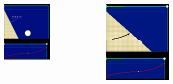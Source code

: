 \documentclass{beamer}
\begin{document}
\begin{frame}
\begin{figure}
	\begin{columns}
		\begin{column}{0.5\textwidth}
			\begin{figure}
				\centering
			\includegraphics[width=0.9\textwidth]{images/arc1.png}	
			\end{figure}		
	    \end{column}
\begin{column}{0.5\textwidth}
	\begin{figure}
		\centering
		\includegraphics[width=0.9\textwidth]{images/arc3.png}	

\end{figure}
\end{column}
\end{columns}
\end{figure}
\end{frame}
\end{document}
